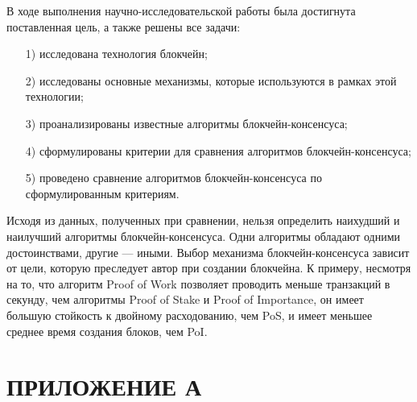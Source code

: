 \documentclass{bmstu}
\begin{document}
В ходе выполнения научно-исследовательской работы была достигнута поставленная цель, а также решены все задачи:

\begin{enumerate}
\item[1)]
исследована технология блокчейн;
\item[2)]
исследованы основные механизмы, которые используются в рамках этой технологии;
\item[3)]
проанализированы известные алгоритмы блокчейн-консенсуса;
\item[4)]
сформулированы критерии для сравнения алгоритмов блокчейн-консенсуса;
\item[5)]
проведено сравнение алгоритмов блокчейн-консенсуса по сформулированным критериям.
\end{enumerate}

Исходя из данных, полученных при сравнении, нельзя определить наихудший и наилучший алгоритмы блокчейн-консенсуса. 
Одни алгоритмы обладают одними достоинствами, другие --- иными. 
Выбор механизма блокчейн-консенсуса зависит от цели, которую преследует автор при создании блокчейна. 
К примеру, несмотря на то, что алгоритм Proof of Work позволяет проводить меньше транзакций в секунду, чем алгоритмы Proof of Stake и Proof of Importance, он имеет большую стойкость к двойному расходованию, чем PoS, и имеет меньшее среднее время создания блоков, чем PoI. 

{\centering {\center\printbibliography[title=СПИСОК ИСПОЛЬЗОВАННЫХ ИСТОЧНИКОВ]}}

{\centering \chapter*{ПРИЛОЖЕНИЕ А}}
\end{document}

